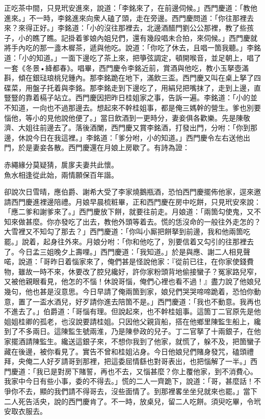 正吃茶中間，只見玳安進來，說道：「李銘來了，在前邊伺候。」西門慶道：「教他進來。」不一時，李銘進來向衆人磕了頭，走在旁邊。西門慶問道：「你往那裡去來？來得正好。」李銘道：「小的沒往那裡去，北邊酒醋門劉公公那裡，教了些孩子，小的瞧了瞧。記掛着爹娘內姐兒們，還有幾段唱未合拍，來伺候。」西門慶就將手內吃的那一盞木樨茶，遞與他吃。說道：「你吃了休去，且唱一箇我聽。」李銘道：「小的知道。」一面下邊吃了茶上來，把箏弦調定，頓開喉音，並足朝上，唱了一套《冬景•絳都春》。唱畢，西門慶令李銘近前，賞酒與他吃，教小玉拏壺滿斟，傾在銀琺琅桃兒鍾內。那李銘跪在地下，滿飲三盃。西門慶又叫在桌上拏了四碟菜，用盤子托着與李銘。那李銘走到下邊吃了，用絹兒把嘴抹了，走到上邊，直豎豎的靠着槅子站立。西門慶因把昨日桂姐家之事，告訴一遍。李銘道：「小的並不知道，一向也不過那邊去。想起來不幹桂姐事，都是俺三媽幹的營生。{}爹也別要惱他，等小的見他說他便了。」當日飲酒到一更時分，妻妾俱各歡樂。先是陳敬濟、大姐往前邊去了。落後酒闌，西門慶又賞李銘酒，打發出門，分咐：「你到那邊，休說今日在我這裡。」李銘道：「爹分咐，小的知道。」西門慶令左右送他出門，於是妻妾各散。西門慶還在月娘上房歇了。有詩為證：

\begin{myquote} 
赤繩緣分莫疑猜，扊扅夫妻共此懷。\\魚水相逢從此始，兩情願保百年諧。
\end{myquote} 

卻說次日雪晴，應伯爵、謝希大受了李家燒鵝瓶酒，恐怕西門慶擺佈他家，逕來邀請西門慶進裡邊陪禮。月娘早晨梳粧畢，正和西門慶在房中吃餅，只見玳安來說：「應二爹和謝爹來了。」西門慶放下餅，就要往前走。月娘道：「兩箇勾使鬼，又不知來做甚麼。你亦發吃了出去，教他外頭等着去。慌的恁沒命的一般往外走怎的？大雪裡又不知勾了那去？」西門慶道：「你叫小厮把餅拏到前邊，我和他兩箇吃罷。」說着，起身往外來。月娘分咐：「你和他吃了，別要信着又勾引的往那裡去了。今日孟三姐晚夕上壽哩。」西門慶道：「我知道。」於是與應、謝二人相見聲喏，說道：「哥昨日着惱家來了，俺們甚是怪說他家：『從前已往，在你家使錢費物，雖故一時不來，休要改了腔兒纔好，許你家粉頭背地偷接蠻子？冤家路兒窄，又被他親眼看見，他怎的不惱！休說哥惱，俺們心裡也看不過！』盡力說了他娘兒幾句，他也甚是沒意思。今日早請了俺兩箇到家，娘兒們哭哭啼啼跪着，恐怕你動意，置了一盃水酒兒，好歹請你進去陪箇不是。」{}西門慶道：「我也不動意。我再也不進去了。」伯爵道：「哥惱有理。但說起來，也不幹桂姐事。這箇丁二官原先是他姐姐桂卿的孤老，也沒說要請桂姐。只因他父親貨船，搭在他鄉里陳監生船上，纔到了不多兩日。這陳監生號兩淮，乃是陳參政的兒子。丁二官拏了十兩銀子，在他家擺酒請陳監生。纔送這銀子來，不想你我到了他家，就慌了，躲不及，把箇蠻子藏在後邊，被你看見了。實告不曾和桂姐沾身。今日他娘兒們賭身發咒，磕頭禮拜，央俺二人好歹請哥到那裡，把這委屈情繇也對哥表出，也把惱解了一半。」西門慶道：「我已是對房下賭誓，再也不去，又惱甚麼？你上覆他家，到不消費心。我家中今日有些小事，委的不得去。」慌的二人一齊跪下，{}說道：「哥，甚麼話！不爭你不去，顯的我們請不得哥去，沒些面情了。到那裡畧坐坐兒就來也罷。」當下二人死告活央，說的西門慶肯了。不一時，放桌兒，留二人吃餅。須臾吃畢，令玳安取衣服去。

